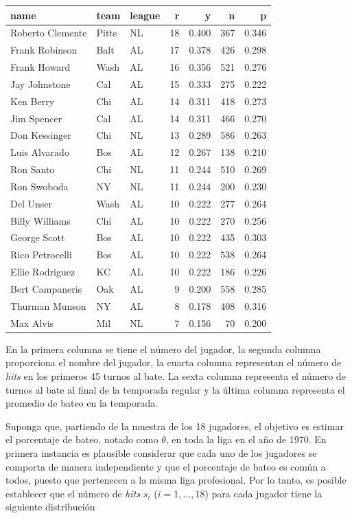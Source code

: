 \documentclass[
  10pt,
  spanish,
]{book}
\theoremstyle{definition}
\theoremstyle{definition}
\theoremstyle{definition}
\theoremstyle{definition}
\theoremstyle{remark}
\begin{document}
\begin{tabular}{l|l|l|r|r|r|r}
\hline
name & team & league & r & y & n & p\\
\hline
Roberto Clemente & Pitts & NL & 18 & 0.400 & 367 & 0.346\\
\hline
Frank Robinson & Balt & AL & 17 & 0.378 & 426 & 0.298\\
\hline
Frank Howard & Wash & AL & 16 & 0.356 & 521 & 0.276\\
\hline
Jay Johnstone & Cal & AL & 15 & 0.333 & 275 & 0.222\\
\hline
Ken Berry & Chi & AL & 14 & 0.311 & 418 & 0.273\\
\hline
Jim Spencer & Cal & AL & 14 & 0.311 & 466 & 0.270\\
\hline
Don Kessinger & Chi & NL & 13 & 0.289 & 586 & 0.263\\
\hline
Luis Alvarado & Bos & AL & 12 & 0.267 & 138 & 0.210\\
\hline
Ron Santo & Chi & NL & 11 & 0.244 & 510 & 0.269\\
\hline
Ron Swoboda & NY & NL & 11 & 0.244 & 200 & 0.230\\
\hline
Del Unser & Wash & AL & 10 & 0.222 & 277 & 0.264\\
\hline
Billy Williams & Chi & AL & 10 & 0.222 & 270 & 0.256\\
\hline
George Scott & Bos & AL & 10 & 0.222 & 435 & 0.303\\
\hline
Rico Petrocelli & Bos & AL & 10 & 0.222 & 538 & 0.264\\
\hline
Ellie Rodriguez & KC & AL & 10 & 0.222 & 186 & 0.226\\
\hline
Bert Campaneris & Oak & AL & 9 & 0.200 & 558 & 0.285\\
\hline
Thurman Munson & NY & AL & 8 & 0.178 & 408 & 0.316\\
\hline
Max Alvis & Mil & NL & 7 & 0.156 & 70 & 0.200\\
\hline
\end{tabular}

En la primera columna se tiene el número del jugador, la segunda columna proporciona el nombre del jugador, la cuarta columna representan el número de \emph{hits} en los primeros 45 turnos al bate. La sexta columna representa el número de turnos al bate al final de la temporada regular y la última columna representa el promedio de bateo en la temporada.

Suponga que, partiendo de la muestra de los 18 jugadores, el objetivo es estimar el porcentaje de bateo, notado como \(\theta\), en toda la liga en el año de 1970. En primera instancia es plausible considerar que cada uno de los jugadores se comporta de manera independiente y que el porcentaje de bateo es común a todos, puesto que pertenecen a la misma liga profesional. Por lo tanto, es posible establecer que el número de \emph{hits} \(s_i\) (\(i=1,\ldots,18\)) para cada jugador tiene la siguiente distribución
\end{document}
